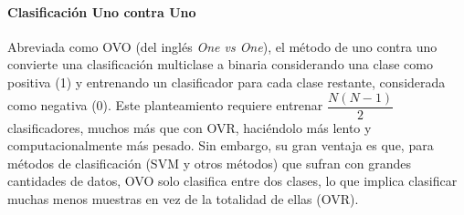 \paragraph{Clasificación Uno contra Uno} \label{par:OVO}

Abreviada como OVO (del inglés \textit{One vs One}), el método de uno contra uno convierte una clasificación multiclase a binaria considerando una clase como positiva (1) y entrenando un clasificador para cada clase restante, considerada como negativa (0). Este planteamiento requiere entrenar $\dfrac{N(N-1)}{2}$ clasificadores, muchos más que con OVR, haciéndolo más lento y computacionalmente más pesado. Sin embargo, su gran ventaja es que, para métodos de clasificación (SVM y otros métodos) que sufran con grandes cantidades de datos, OVO solo clasifica entre dos clases, lo que implica clasificar muchas menos muestras en vez de la totalidad de ellas (OVR).




